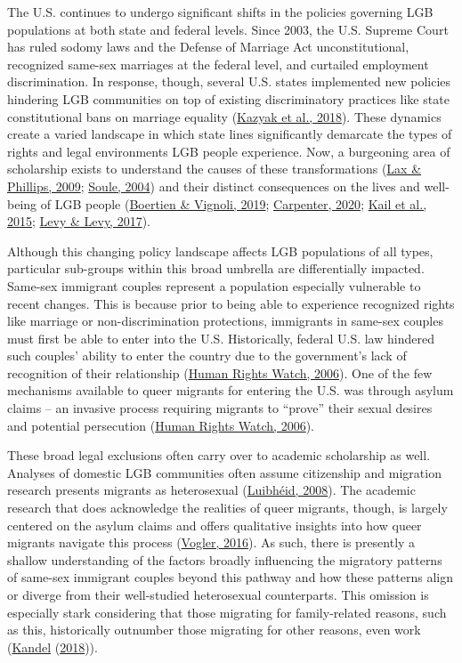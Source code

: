 \documentclass[
  11pt,
]{article}
\begin{document}
The U.S. continues to undergo significant shifts in the policies governing LGB populations at both state and federal levels. Since 2003, the U.S. Supreme Court has ruled sodomy laws and the Defense of Marriage Act unconstitutional, recognized same-sex marriages at the federal level, and curtailed employment discrimination. In response, though, several U.S. states implemented new policies hindering LGB communities on top of existing discriminatory practices like state constitutional bans on marriage equality (\protect\hyperlink{ref-kazyak_2018}{Kazyak et al., 2018}). These dynamics create a varied landscape in which state lines significantly demarcate the types of rights and legal environments LGB people experience. Now, a burgeoning area of scholarship exists to understand the causes of these transformations (\protect\hyperlink{ref-lax_2009}{Lax \& Phillips, 2009}; \protect\hyperlink{ref-soule_2004}{Soule, 2004}) and their distinct consequences on the lives and well-being of LGB people (\protect\hyperlink{ref-boertien_2019}{Boertien \& Vignoli, 2019}; \protect\hyperlink{ref-carpenter_2020}{Carpenter, 2020}; \protect\hyperlink{ref-kail_2015}{Kail et al., 2015}; \protect\hyperlink{ref-levy_2017}{Levy \& Levy, 2017}).

Although this changing policy landscape affects LGB populations of all types, particular sub-groups within this broad umbrella are differentially impacted. Same-sex immigrant couples represent a population especially vulnerable to recent changes. This is because prior to being able to experience recognized rights like marriage or non-discrimination protections, immigrants in same-sex couples must first be able to enter into the U.S. Historically, federal U.S. law hindered such couples' ability to enter the country due to the government's lack of recognition of their relationship (\protect\hyperlink{ref-humanrightswatch_2006}{Human Rights Watch, 2006}). One of the few mechanisms available to queer migrants for entering the U.S. was through asylum claims -- an invasive process requiring migrants to ``prove'' their sexual desires and potential persecution (\protect\hyperlink{ref-humanrightswatch_2006}{Human Rights Watch, 2006}).

These broad legal exclusions often carry over to academic scholarship as well. Analyses of domestic LGB communities often assume citizenship and migration research presents migrants as heterosexual (\protect\hyperlink{ref-luibheid_2008}{Luibhéid, 2008}). The academic research that does acknowledge the realities of queer migrants, though, is largely centered on the asylum claims and offers qualitative insights into how queer migrants navigate this process (\protect\hyperlink{ref-vogler_2016}{Vogler, 2016}). As such, there is presently a shallow understanding of the factors broadly influencing the migratory patterns of same-sex immigrant couples beyond this pathway and how these patterns align or diverge from their well-studied heterosexual counterparts.
This omission is especially stark considering that those migrating for family-related reasons, such as this, historically outnumber those migrating for other reasons, even work (\protect\hyperlink{ref-kandel_2018_familybased}{Kandel} (\protect\hyperlink{ref-kandel_2018_familybased}{2018})).
\end{document}
